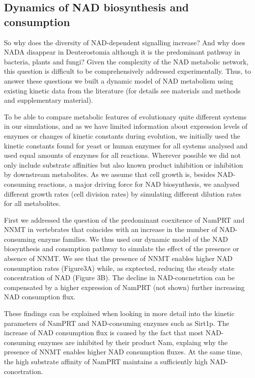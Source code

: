 \subsection{Dynamics of NAD biosynthesis and consumption}

So why does the diversity of NAD-dependent signalling increase? And why does NADA disappear in Deuterostomia although it is the predominant pathway in bacteria, plants and fungi? Given the complexity of the NAD metabolic network, this question is difficult to be comprehensively addressed experimentally. Thus, to answer these questions we built a dynamic model of NAD metabolism using existing kinetic data from the literature (for details see materials and methods and supplementary material).

To be able to compare metabolic features of evolutionary quite different systems in our simulations, and as we have limited information about expression levels of enzymes or changes of kinetic constants during evolution, we initially used the kinetic constants found for yeast or human enzymes for all systems analysed and used equal amounts of enzymes for all reactions. Wherever possible we did not only include substrate affinities but also known product inhibition or inhibition by downstream metabolites. As we assume that cell growth is, besides NAD-consuming reactions, a major driving force for NAD biosynthesis, we analysed different growth rates (cell division rates) by simulating different dilution rates for all metabolites. 

First we addressed the question of the predominant coexitence of NamPRT and NNMT in vertebrates that coincides with an increase in the number of NAD-consuming enzyme families. We thus used our dynamic model of the NAD biosynthesis and consmption pathway to simulate the effect of the  presence or absence of NNMT.  We see that the presence of NNMT enables higher NAD consumption rates  (Figure3A) while, as exptected, reducing the steady state concentration of NAD (Figure 3B). The decline in NAD-concnetrtion can be compensated by a higher expression of NamPRT (not shown) further increasing NAD consumption flux.

These findings can be explained when looking in more detail into the kinetic parameters of NamPRT and NAD-consuming enzymes such as Sirt1p.  The increase of NAD consumption flux is caused by the fact that most NAD-consuming enzymes are inhibited by their product Nam, explaing why the presence of NNMT enables higher NAD consumption fluxes. At the same time, the high substrate affinity of NamPRT maintains a sufficiently high NAD-concetration.


